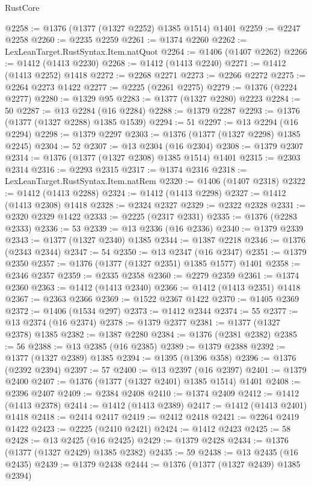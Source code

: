 \begin{lexlean}{RustCore}
\begin{coremodule}
@2258 := @1376 (@1377 (@1327 @2252) @1385 @1514) @1401
@2259 := @2247 @2258
@2260 := @2235 @2259
@2261 := @1374 @2260
@2262 := LexLeanTarget.RustSyntax.Item.natQuot
@2264 := @1406 (@1407 @2262)
@2266 := @1412 (@1413 @2230)
@2268 := @1412 (@1413 @2240)
@2271 := @1412 (@1413 @2252) @1418
@2272 := @2268 @2271
@2273 := @2266 @2272
@2275 := @2264 @2273 @1422
@2277 := @2225 (@2261 @2275)
@2279 := @1376 (@2224 @2277)
@2280 := @1329 @95
@2283 := @1377 (@1327 @2280) @2223
@2284 := 50
@2287 := @13 @2284 (@16 @2284)
@2288 := @1379 @2287
@2293 := @1376 (@1377 (@1327 @2288) @1385 @1539)
@2294 := 51
@2297 := @13 @2294 (@16 @2294)
@2298 := @1379 @2297
@2303 := @1376 (@1377 (@1327 @2298) @1385 @2245)
@2304 := 52
@2307 := @13 @2304 (@16 @2304)
@2308 := @1379 @2307
@2314 := @1376 (@1377 (@1327 @2308) @1385 @1514) @1401
@2315 := @2303 @2314
@2316 := @2293 @2315
@2317 := @1374 @2316
@2318 := LexLeanTarget.RustSyntax.Item.natRem
@2320 := @1406 (@1407 @2318)
@2322 := @1412 (@1413 @2288)
@2324 := @1412 (@1413 @2298)
@2327 := @1412 (@1413 @2308) @1418
@2328 := @2324 @2327
@2329 := @2322 @2328
@2331 := @2320 @2329 @1422
@2333 := @2225 (@2317 @2331)
@2335 := @1376 (@2283 @2333)
@2336 := 53
@2339 := @13 @2336 (@16 @2336)
@2340 := @1379 @2339
@2343 := @1377 (@1327 @2340) @1385
@2344 := @1387 @2218
@2346 := @1376 (@2343 @2344)
@2347 := 54
@2350 := @13 @2347 (@16 @2347)
@2351 := @1379 @2350
@2357 := @1376 (@1377 (@1327 @2351) @1385 @1577) @1401
@2358 := @2346 @2357
@2359 := @2335 @2358
@2360 := @2279 @2359
@2361 := @1374 @2360
@2363 := @1412 (@1413 @2340)
@2366 := @1412 (@1413 @2351) @1418
@2367 := @2363 @2366
@2369 := @1522 @2367 @1422
@2370 := @1405 @2369
@2372 := @1406 (@1534 @297)
@2373 := @1412 @2344
@2374 := 55
@2377 := @13 @2374 (@16 @2374)
@2378 := @1379 @2377
@2381 := @1377 (@1327 @2378) @1385
@2382 := @1387 @2280
@2384 := @1376 (@2381 @2382)
@2385 := 56
@2388 := @13 @2385 (@16 @2385)
@2389 := @1379 @2388
@2392 := @1377 (@1327 @2389) @1385
@2394 := @1395 (@1396 @358)
@2396 := @1376 (@2392 @2394)
@2397 := 57
@2400 := @13 @2397 (@16 @2397)
@2401 := @1379 @2400
@2407 := @1376 (@1377 (@1327 @2401) @1385 @1514) @1401
@2408 := @2396 @2407
@2409 := @2384 @2408
@2410 := @1374 @2409
@2412 := @1412 (@1413 @2378)
@2414 := @1412 (@1413 @2389)
@2417 := @1412 (@1413 @2401) @1418
@2418 := @2414 @2417
@2419 := @2412 @2418
@2421 := @2264 @2419 @1422
@2423 := @2225 (@2410 @2421)
@2424 := @1412 @2423
@2425 := 58
@2428 := @13 @2425 (@16 @2425)
@2429 := @1379 @2428
@2434 := @1376 (@1377 (@1327 @2429) @1385 @2382)
@2435 := 59
@2438 := @13 @2435 (@16 @2435)
@2439 := @1379 @2438
@2444 := @1376 (@1377 (@1327 @2439) @1385 @2394)

\end{coremodule}
\end{lexlean}
